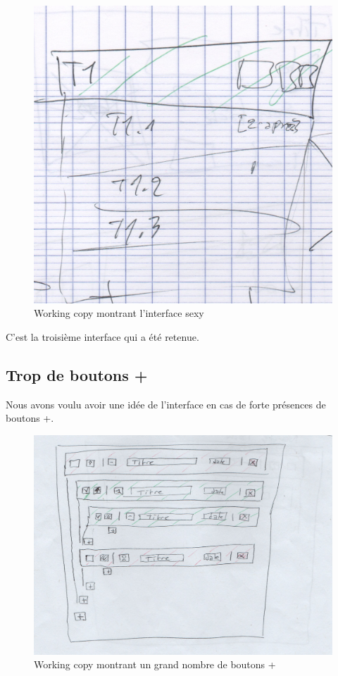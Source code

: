 \documentclass[11pt]{article}
\begin{document}
\begin{figure}[H]
  \centering
  \includegraphics[width=12cm]{img/sexy.jpg}
  \caption{Working copy montrant l'interface sexy}
  \label{fig:sexy}
\end{figure}

C'est la troisième interface qui a été retenue.

\subsection{Trop de boutons +}
\label{ann:plusplusplus}

Nous avons voulu avoir une idée de l'interface en cas de forte
présences de boutons +.

\begin{figure}[H]
  \centering
  \includegraphics[width=12cm]{img/massboutons.jpg}
  \caption{Working copy montrant un grand nombre de boutons +}
  \label{fig:massplus}
\end{figure}
\end{document}
